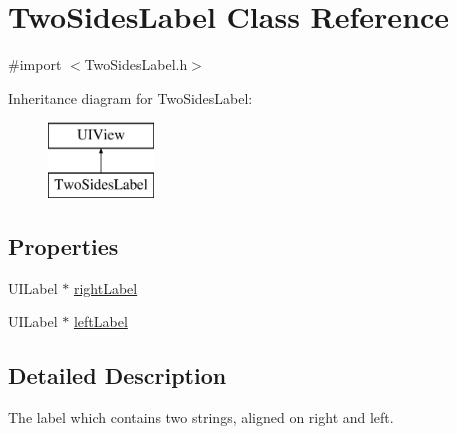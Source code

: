 \hypertarget{interface_two_sides_label}{\section{Two\+Sides\+Label Class Reference}
\label{interface_two_sides_label}
}


{\ttfamily \#import $<$Two\+Sides\+Label.\+h$>$}

Inheritance diagram for Two\+Sides\+Label\+:\begin{figure}[H]
\begin{center}
\leavevmode
\includegraphics[height=2.000000cm]{interface_two_sides_label}
\end{center}
\end{figure}
\subsection*{Properties}
\begin{DoxyCompactItemize}
\item 
U\+I\+Label $\ast$ \hyperlink{interface_two_sides_label_a91d247769e9ab61c90583be8048c30e7}{right\+Label}
\item 
U\+I\+Label $\ast$ \hyperlink{interface_two_sides_label_ae2c5763f3d4b956e6572efb8af215605}{left\+Label}
\end{DoxyCompactItemize}


\subsection{Detailed Description}
The label which contains two strings, aligned on right and left. 

